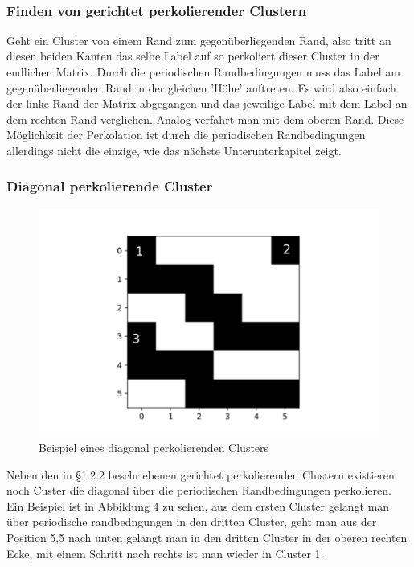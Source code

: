 \documentclass[a4paper, 12pt]{scrartcl}
\begin{document}
\
\subsubsection{Finden von gerichtet perkolierender Clustern}Geht ein Cluster von einem Rand zum gegenüberliegenden Rand, also tritt an diesen beiden Kanten das selbe Label auf so perkoliert dieser Cluster in der endlichen Matrix. Durch die periodischen Randbedingungen muss das Label am gegenüberliegenden Rand in der gleichen 'Höhe' auftreten. Es wird also einfach der linke Rand der Matrix abgegangen und das jeweilige Label mit dem Label an dem rechten Rand verglichen. Analog verfährt man mit dem oberen Rand. Diese Möglichkeit der Perkolation ist durch die periodischen Randbedingungen allerdings nicht die einzige, wie das nächste Unterunterkapitel zeigt.

\subsubsection{Diagonal perkolierende Cluster}
\begin{figure}[h!]
	\centering
	\includegraphics[scale=0.6]{diagonalperc1.pdf}
	\caption{Beispiel eines diagonal perkolierenden Clusters}
\end{figure}
\vspace{0,5cm}
\noindent Neben den in §1.2.2 beschriebenen gerichtet perkolierenden Clustern existieren noch Custer die diagonal über die periodischen Randbedingungen perkolieren. Ein Beispiel ist in Abbildung 4 zu sehen, aus dem ersten Cluster gelangt man über periodische randbedngungen in den dritten Cluster, geht man aus der Position 5,5 nach unten gelangt man in den dritten Cluster in der oberen rechten Ecke, mit einem Schritt nach rechts ist man wieder in Cluster 1.
\end{document}
